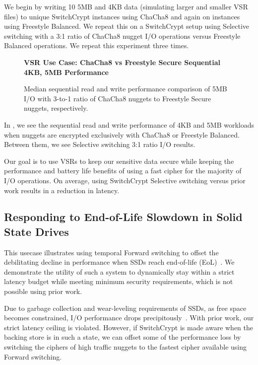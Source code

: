 We begin by writing 10 5MB and 4KB data (simulating larger and smaller VSR
files) to unique SwitchCrypt instances using ChaCha8 and again on instances
using Freestyle Balanced. We repeat this on a SwitchCrypt setup using Selective
switching with a 3:1 ratio of ChaCha8 nugget I/O operations versus Freestyle
Balanced operations. We repeat this experiment three times.

\begin{figure}[ht] \textbf{VSR Use Case: ChaCha8 vs Freestyle Secure Sequential
4KB, 5MB Performance}\par\medskip
   \centering
   {} \caption{Median sequential read and
   write performance comparison of 5MB I/O with 3-to-1 ratio of ChaCha8 nuggets
   to Freestyle Secure nuggets, respectively.}
  \label{fig:usecase-vsr-bar}
\end{figure}

In , we see the sequential read and write performance of
4KB and 5MB workloads when nuggets are encrypted exclusively with ChaCha8 or
Freestyle Balanced. Between them, we see Selective switching 3:1 ratio I/O
results.

Our goal is to use VSRs to keep our sensitive data secure while keeping
the performance and battery life benefits of using a fast cipher for the
majority of I/O operations. On average, using SwitchCrypt Selective switching
versus prior work results in a  reduction in latency.

\subsection{Responding to End-of-Life Slowdown in Solid State Drives}\label{subsec:uc3}

This usecase illustrates using temporal Forward switching to offset the
debilitating decline in performance when SSDs reach end-of-life
(EoL)~\cite{SSDEOL1, SSDEOL2, SSDEOL3}. We demonstrate the utility of such a
system to dynamically stay within a strict latency budget while meeting minimum
security requirements, which is not possible using prior work.

Due to garbage collection and wear-leveling requirements of SSDs, as free space
becomes constrained, I/O performance drops precipitously~\cite{SSDEOL1, SSDEOL2,
SSDEOL3}. With prior work, our strict latency ceiling is violated. However, if
SwitchCrypt is made aware when the backing store is in such a state, we can
offset some of the performance loss by switching the ciphers of high traffic
nuggets to the fastest cipher available using Forward switching.

